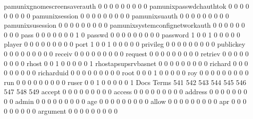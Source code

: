 \documentclass[compress,8pt]{beamer}
\begin{document}
\begin{frame}
\begin{Schunk}
  pamunixgnomescreensaverauth                0   0   0   0   0   0   0   0   0
  pamunixpasswdchauthtok                     0   0   0   0   0   0   0   0   0
  pamunixsession                             0   0   0   0   0   0   0   0   0
  pamunixsuauth                              0   0   0   0   0   0   0   0   0
  pamunixsusession                           0   0   0   0   0   0   0   0   0
  pamunixsystemconfignetworkauth             0   0   0   0   0   0   0   0   0
  pass                                       0   0   0   0   0   0   0   1   0
  passwd                                     0   0   0   0   0   0   0   0   0
  password                                   1   0   0   1   0   0   0   0   0
  player                                     0   0   0   0   0   0   0   0   0
  port                                       1   0   0   1   0   0   0   0   0
  privileg                                   0   0   0   0   0   0   0   0   0
  publickey                                  0   0   0   0   0   0   0   0   0
  receiv                                     0   0   0   0   0   0   0   0   0
  request                                    0   0   0   0   0   0   0   0   0
  retriev                                    0   0   0   0   0   0   0   0   0
  rhost                                      0   0   1   0   0   0   0   0   1
  rhostapsupsrvbasnet                        0   0   0   0   0   0   0   0   0
  richard                                    0   0   0   0   0   0   0   0   0
  richarduid                                 0   0   0   0   0   0   0   0   0
  root                                       0   0   0   1   0   0   0   0   0
  roy                                        0   0   0   0   0   0   0   0   0
  run                                        0   0   0   0   0   0   0   0   0
  ruser                                      0   0   1   0   0   0   0   0   1
                                          Docs
Terms                                      541 542 543 544 545 546 547 548 549
  accept                                     0   0   0   0   0   0   0   0   0
  access                                     0   0   0   0   0   0   0   0   0
  address                                    0   0   0   0   0   0   0   0   0
  admin                                      0   0   0   0   0   0   0   0   0
  age                                        0   0   0   0   0   0   0   0   0
  allow                                      0   0   0   0   0   0   0   0   0
  apr                                        0   0   0   0   0   0   0   0   0
  argument                                   0   0   0   0   0   0   0   0   0

\end{Schunk}
\end{frame}
\end{document}
